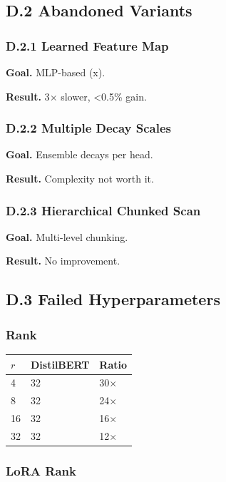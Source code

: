 \subsection{D.2 Abandoned Variants}

\subsubsection{D.2.1 Learned Feature Map}

\textbf{Goal.} MLP-based  (x).

\textbf{Result.} 3$\times$ slower, \textless{}0.5\% gain.

\subsubsection{D.2.2 Multiple Decay Scales}

\textbf{Goal.} Ensemble decays per head.

\textbf{Result.} Complexity not worth it.

\subsubsection{D.2.3 Hierarchical Chunked Scan}

\textbf{Goal.} Multi-level chunking.

\textbf{Result.} No improvement.

\subsection{D.3 Failed Hyperparameters}

\subsubsection{Rank}

\begin{table}[H]
\centering
\small
\begin{tabular}{lll}
\toprule
\textbf{$r$} & \textbf{DistilBERT} & \textbf{Ratio} \\
\midrule
4 & 32 & 30$\times$ \\
8 & 32 & 24$\times$ \\
16 & 32 & 16$\times$ \\
32 & 32 & 12$\times$ \\
\bottomrule
\end{tabular}
\end{table}

\subsubsection{LoRA Rank}


